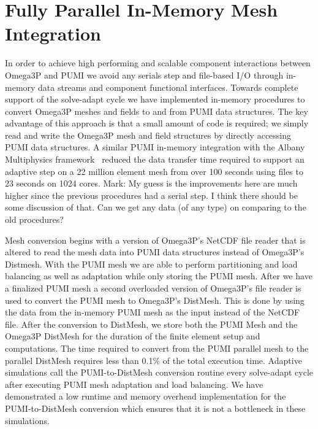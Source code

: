 \documentclass[review,12pt]{elsarticle_summary_report}
\begin{document}
\section{\label{in_memory}Fully Parallel In-Memory Mesh Integration}
In order to achieve high performing and scalable component interactions between
Omega3P and PUMI we avoid any serials step and 
file-based I/O through in-memory data streams and component functional
interfaces. Towards complete support of the solve-adapt cycle we have implemented in-memory
procedures to convert Omega3P meshes and fields to and from  PUMI data structures.
The key advantage of this approach is that a small amount of code is 
required; we simply read and write the Omega3P mesh and field
structures by directly accessing PUMI data structures.
A similar PUMI in-memory integration with the Albany Multiphysics
framework~\cite{Albany2015,salinger2013albany} reduced the data transfer time
required to support an adaptive step on a 22 million element mesh from over 100
seconds using files to 23 seconds on 1024 cores. \color{blue} Mark: My guess is the improvements here are much higher since the previous procedures had a serial step. I think there should be some discussion of that. Can we get any data (of any type) on comparing to the old procedures? \color{black}

Mesh conversion begins with a version of Omega3P's NetCDF file reader that is altered
to read the mesh data into PUMI data structures instead of Omega3P's Distmesh. With 
the PUMI mesh we are able to perform partitioning and load balancing as well as adaptation 
while only storing the PUMI mesh. After we have a finalized PUMI mesh a second 
overloaded version of Omega3P's file reader is used to convert the PUMI mesh to 
Omega3P's DistMesh. This is done by using the data from the in-memory PUMI mesh as the 
input instead of the NetCDF file. After the conversion to DistMesh, we store both the
PUMI Mesh and the Omega3P DistMesh for the duration of the finite element setup and 
computations. The time required to convert from the PUMI parallel mesh to the
parallel DistMesh requires less than 0.1\% of the total execution time.
Adaptive simulations call the PUMI-to-DistMesh conversion routine every
solve-adapt cycle after executing PUMI mesh adaptation and load balancing.
We have demonstrated a low runtime and memory overhead implementation for the
PUMI-to-DistMesh conversion which ensures that it is not a bottleneck
in these simulations.
\end{document}
